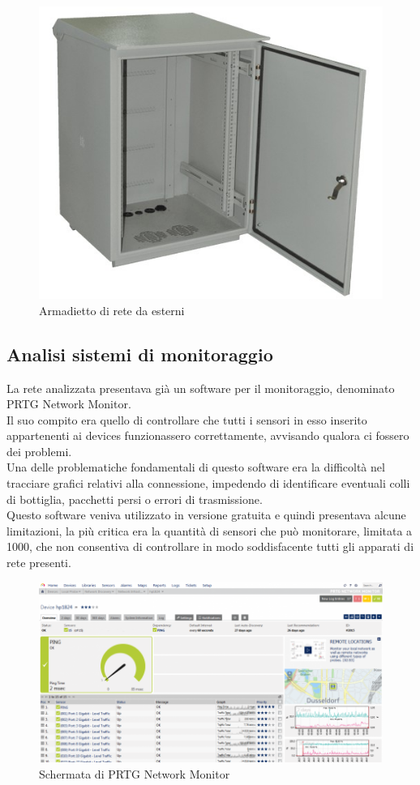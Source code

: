 \documentclass[Tesi.tex]{subfiles}
\begin{document}
\begin{figure}[H]
	\centering
	\includegraphics[width=0.5\linewidth]{"images/Outdoor rack"}
	\caption{Armadietto di rete da esterni}
	\label{fig:Armadietto di rete da esterni}
\end{figure}

\subsection{Analisi sistemi di monitoraggio}
La rete analizzata presentava già un software per il monitoraggio, denominato PRTG Network Monitor. \\
Il suo compito era quello di controllare che tutti i sensori in esso inserito appartenenti ai devices funzionassero correttamente, avvisando qualora ci fossero dei problemi. \\
Una delle problematiche fondamentali di questo software era la difficoltà nel tracciare grafici relativi alla connessione, impedendo di identificare eventuali colli di bottiglia, pacchetti persi o errori di trasmissione. \\
Questo software veniva utilizzato in versione gratuita e quindi presentava alcune limitazioni, la più critica era la quantità di sensori che può monitorare, limitata a 1000, che non consentiva di controllare in modo soddisfacente tutti gli apparati di rete presenti. \\

\begin{figure}[H]
	\centering
	\includegraphics[width=0.8\linewidth]{"images/PRTGStatistics"}
	\caption{Schermata di PRTG Network Monitor}
	\label{fig:Schermata di PRTG Network Monitor}
\end{figure}
\end{document}
